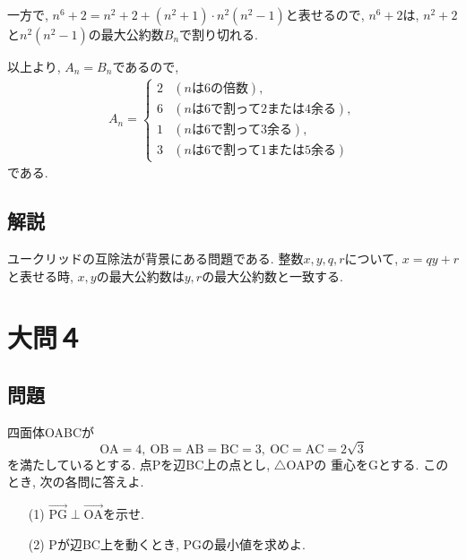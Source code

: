 \documentclass[dvipdfmx,a4paper]{jsarticle}
\newcommand{\oraw}{\overrightarrow}
\newcommand{\2}{I\hspace{-1pt}I}
\newcommand{\3}{I\hspace{-1pt}I\hspace{-1pt}I}
\begin{document}
    一方で, $n^6+2 = n^2+2 + (n^2+1) \cdot n^2(n^2-1)$と表せるので, 
    $n^6+2$は, $n^2+2$と$n^2(n^2-1)$の最大公約数$B_n$で割り切れる. 

    以上より, $A_n = B_n$であるので, 
    \begin{eqnarray*}
        A_n = \left\{
            \begin{array}{lll}
                2 & (n\mathrm{は6の倍数}), \\
                6 & (n\mathrm{は6で割って2または4余る}), \\
                1 & (n\mathrm{は6で割って3余る}), \\
                3 & (n\mathrm{は6で割って1または5余る})
            \end{array}
        \right.
    \end{eqnarray*}
    である. 


    \subsection{解説}
    ユークリッドの互除法が背景にある問題である. 整数$x,y,q,r$について, $x = qy +r$
    と表せる時, $x,y$の最大公約数は$y,r$の最大公約数と一致する. 


    \section{大問４}
    \subsection{問題}
    四面体OABCが
    \begin{equation*}
        \mathrm{
            OA = 4,\ OB=AB=BC=3,\ OC=AC=2\sqrt{3}
        }
    \end{equation*}
    を満たしているとする. 点Pを辺BC上の点とし, $\triangle \mathrm{OAP}$の
    重心をGとする. このとき, 次の各問に答えよ. 
    \begin{itemize}
        \item [(1)] $\oraw{\mathrm{PG}} \perp \oraw{\mathrm{OA}}$を示せ. 
        \item [(2)] Pが辺BC上を動くとき, PGの最小値を求めよ. 
    \end{itemize}
\end{document}
